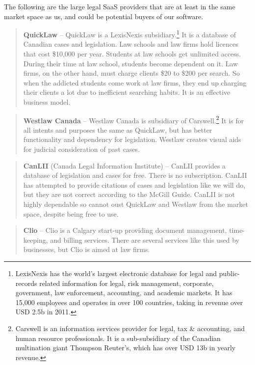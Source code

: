 \documentclass[11pt]{article}
\begin{document}
The following are the large legal SaaS providers that are at least in the same market space as us, and could be potential buyers of our software.

\begin{quote}
\textbf{QuickLaw} -- QuickLaw is a LexisNexis subsidiary.\footnote{LexisNexis has the world's largest electronic database for legal and public-records related information for legal, risk management, corporate, government, law enforcement, accounting, and academic markets. It has 15,000 employees and operates in over 100 countries, taking in revenue over USD 2.5b in 2011.} It is a database of Canadian cases and legislation. Law schools and law firms hold licences that cost \$10,000 per year. Students at law schools get unlimited access. During their time at law school, students become dependent on it. Law firms, on the other hand, must charge clients \$20 to \$200 per search. So when the addicted students come work at law firms, they end up charging their clients a lot due to inefficient searching habits. It is an effective business model.
\end{quote}

\begin{quote}
\textbf{Westlaw Canada} -- Westlaw Canada is subsidiary of Carswell.\footnote{Carswell is an information services provider for legal, tax \& accounting, and human resource professionals. It is a sub-subsidiary of the Canadian multination giant Thompson Reuter's, which has over USD 13b in yearly revenue.} It is for all intents and purposes the same as QuickLaw, but has better functionality and dependency for legislation. Westlaw creates visual aids for judicial consideration of past cases.
\end{quote}

\begin{quote}
\textbf{CanLII} (Canada Legal Information Institute) -- CanLII provides a database of legislation and cases for free. There is no subscription. CanLII has attempted to provide citations of cases and legislation like we will do, but they are not correct according to the McGill Guide. CanLII is not highly dependable so cannot oust QuickLaw and Westlaw from the market space, despite being free to use.
\end{quote}

\begin{quote}
\textbf{Clio} -- Clio is a Calgary start-up providing document management, time-keeping, and billing services. There are several services like this used by businesses, but Clio is aimed at law firms. 
\end{quote}
\end{document}

